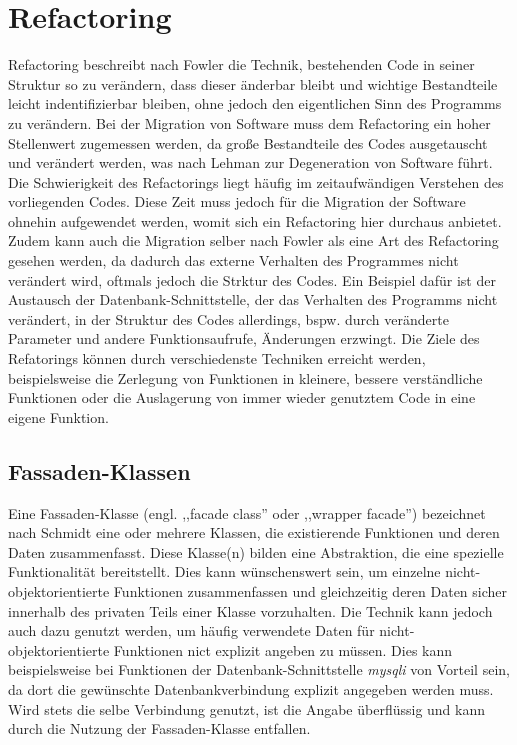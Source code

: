\section{Refactoring} %
    Refactoring beschreibt nach Fowler die Technik, bestehenden Code in seiner Struktur so zu verändern, dass dieser änderbar bleibt und wichtige Bestandteile leicht indentifizierbar 
    bleiben, ohne jedoch den eigentlichen Sinn des Programms zu verändern. \cite{fowler_refactoring_1999} Bei der Migration von Software muss dem Refactoring ein hoher Stellenwert zugemessen werden, 
    da große Bestandteile des Codes ausgetauscht und verändert werden, was nach Lehman \cite[S. 1060-1076]{lehman_programs_1980} zur Degeneration von Software führt.
    Die Schwierigkeit des Refactorings liegt häufig im zeitaufwändigen Verstehen des vorliegenden Codes. Diese Zeit muss jedoch für die Migration der Software ohnehin 
    aufgewendet werden, womit sich ein Refactoring hier durchaus anbietet. Zudem kann auch die Migration selber nach Fowler als eine 
    Art des Refactoring gesehen werden, da dadurch das externe Verhalten des Programmes nicht verändert wird, oftmals jedoch 
    die Strktur des Codes. Ein Beispiel dafür ist der Austausch der Datenbank-Schnittstelle, der das Verhalten des Programms 
    nicht verändert, in der Struktur des Codes allerdings, bspw. durch veränderte Parameter und andere Funktionsaufrufe, 
    Änderungen erzwingt.
    Die Ziele des Refatorings können durch verschiedenste Techniken erreicht werden, beispielsweise die Zerlegung von Funktionen in kleinere, bessere verständliche 
    Funktionen oder die Auslagerung von immer wieder genutztem Code in eine eigene Funktion.
    \subsection{Fassaden-Klassen}
    Eine Fassaden-Klasse (engl. ,,facade class'' oder ,,wrapper facade'') bezeichnet nach Schmidt eine oder mehrere Klassen, die 
    existierende Funktionen und deren Daten zusammenfasst. Diese Klasse(n) bilden eine Abstraktion, die eine spezielle 
    Funktionalität bereitstellt. \cite[S. 54]{schmidt_pattern-oriented_2000} 
    Dies kann wünschenswert sein, um einzelne nicht-objektorientierte Funktionen zusammenfassen und gleichzeitig deren Daten 
    sicher innerhalb des privaten Teils einer Klasse vorzuhalten. Die Technik kann jedoch auch dazu genutzt werden, um häufig 
    verwendete Daten für nicht-objektorientierte Funktionen nict explizit angeben zu müssen. Dies kann beispielsweise 
    bei Funktionen der Datenbank-Schnittstelle \textit{mysqli} von Vorteil sein, da dort die gewünschte Datenbankverbindung 
    explizit angegeben werden muss. Wird stets die selbe Verbindung genutzt, ist die Angabe überflüssig und kann durch die 
    Nutzung der Fassaden-Klasse entfallen. 
